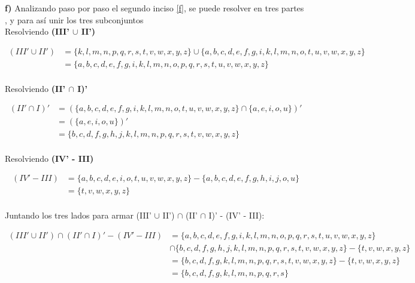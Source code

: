 \newpage

\textbf{f)} Analizando paso por paso el segundo inciso \ref{f}, se puede resolver en tres partes \textbf{} , \textbf{} y \textbf{} para así unir los tres subconjuntos \\

Resolviendo \textbf{(III' $\cup$ II')}

\begin{align*}
(III' \cup II')  &= \{ k, l, m, n, p, q, r, s, t, v, w, x, y, z \} \cup  \{ a, b, c, d, e, f, g, i, k, l, m, n, o, t, u, v, w, x, y, z \} \\
  &=   \{ a, b, c, d, e, f, g, i, k, l, m, n, o, p, q, r, s, t, u, v, w, x, y, z \}       \\
\end{align*}

Resolviendo \textbf{(II' $\cap$ I)' }

\begin{align*}
(II' \cap I)'   &= (\{ a, b, c, d, e, f, g, i, k, l, m, n, o, t, u, v, w, x, y, z \} \cap \{a, e, i, o, u\})' \\
  &=  ( \{a, e, i, o, u\} )' \\
  &= \{ b, c, d, f, g, h, j, k, l, m, n, p, q, r, s, t, v, w, x, y, z \}  \\
\end{align*}


Resolviendo \textbf{(IV' - III)}

\begin{align*}
(IV' - III)  &= \{ a, b, c, d, e, i, o, t, u, v, w, x, y, z \} - \{ a, b, c, d, e, f, g, h, i, j, o, u  \} \\
  &=  \{ t, v, w, x, y, z \}  \\
\end{align*}

Juntando los tres lados para armar (III' $\cup$ II') $\cap$ (II' $\cap$ I)' - (IV' - III):

\begin{align*}
(III' \cup II') \cap (II' \cap I)' - (IV' - III) &= \{ a, b, c, d, e, f, g, i, k, l, m, n, o, p, q, r, s, t, u, v, w, x, y, z \} \\ &\cap \{ b, c, d, f, g, h, j, k, l, m, n, p, q, r, s, t, v, w, x, y, z \}  - \{ t, v, w, x, y, z \}  \\
  &=  \{b, c, d,  f, g, k, l, m, n, p, q, r, s, t, v, w, x, y, z \} 
 - \{ t, v, w, x, y, z \} \\
 &=  \{  b, c, d, f, g, k, l, m, n, p, q, r, s      \} 
\end{align*}

